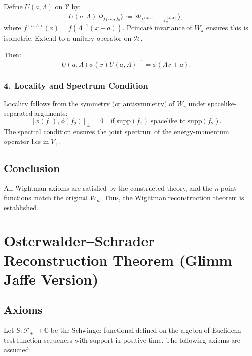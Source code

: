 \documentclass{article}
\newcommand{\1}{\mathbbm{1}}
\theoremstyle{plain}
\theoremstyle{definition}
\numberwithin{equation}{section}
\begin{document}
Define $U(a, \Lambda)$ on $\mathscr{V}$ by:
\[
U(a, \Lambda) |\Phi_{f_1, \dots, f_n}\rangle := |\Phi_{f_1^{(a,\Lambda)}, \dots, f_n^{(a,\Lambda)}}\rangle,
\]
where $f^{(a,\Lambda)}(x) = f(\Lambda^{-1}(x - a))$. Poincaré invariance of $W_n$ ensures this is isometric. Extend to a unitary operator on $\mathcal{H}$.

Then:
\[
U(a, \Lambda) \phi(x) U(a, \Lambda)^{-1} = \phi(\Lambda x + a).
\]

\subsubsection{4. Locality and Spectrum Condition}

Locality follows from the symmetry (or antisymmetry) of $W_n$ under spacelike-separated arguments:
\[
[\phi(f_1), \phi(f_2)]_\pm = 0 \quad \text{if } \text{supp}(f_1) \text{ spacelike to } \text{supp}(f_2).
\]
The spectral condition ensures the joint spectrum of the energy-momentum operator lies in $\bar{V}_+$.

\subsection*{Conclusion}

All Wightman axioms are satisfied by the constructed theory, and the $n$-point functions match the original $W_n$. Thus, the Wightman reconstruction theorem is established.


\section{Osterwalder--Schrader Reconstruction Theorem (Glimm--Jaffe Version)}

\subsection*{Axioms}

Let $S: \mathcal{F}_+ \to \mathbb{C}$ be the Schwinger functional defined on the algebra of Euclidean test function sequences with support in positive time. The following axioms are assumed:
\end{document}
